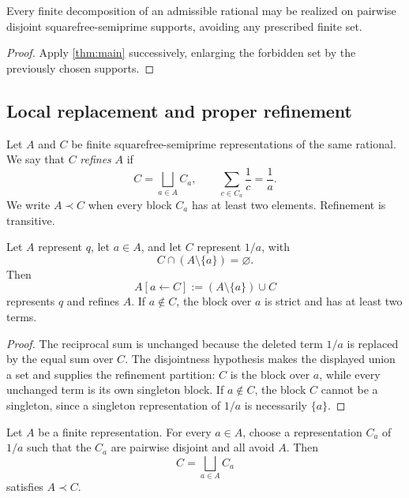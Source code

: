 \begin{corollary}
\label{cor:disjoint-realization}
Every finite decomposition of an admissible rational may be realized on pairwise disjoint squarefree-semiprime supports, avoiding any prescribed finite set.
\end{corollary}

\begin{proof}
Apply \cref{thm:main} successively, enlarging the forbidden set by the previously chosen supports.
\end{proof}

\subsection{Local replacement and proper refinement}

\begin{definition}
Let $A$ and $C$ be finite squarefree-semiprime representations of the same rational.  We say that $C$ \emph{refines} $A$ if
\[
 C=\bigsqcup_{a\in A}C_a,
 \qquad
 \sum_{c\in C_a}\frac1c=\frac1a.
\]
We write $A\prec C$ when every block $C_a$ has at least two elements.  Refinement is transitive.
\end{definition}

\begin{lemma}
\label{lem:local-replacement}
Let $A$ represent $q$, let $a\in A$, and let $C$ represent $1/a$, with
\[
 C\cap(A\setminus\{a\})=\varnothing.
\]
Then
\[
 A[a\leftarrow C]:=(A\setminus\{a\})\cup C
\]
represents $q$ and refines $A$.  If $a\notin C$, the block over $a$ is strict and has at least two terms.
\end{lemma}

\begin{proof}
The reciprocal sum is unchanged because the deleted term $1/a$ is replaced by the equal sum over $C$.  The disjointness hypothesis makes the displayed union a set and supplies the refinement partition: $C$ is the block over $a$, while every unchanged term is its own singleton block.  If $a\notin C$, the block $C$ cannot be a singleton, since a singleton representation of $1/a$ is necessarily $\{a\}$.
\end{proof}

\begin{corollary}
\label{cor:simultaneous-proper-replacement}
Let $A$ be a finite representation.  For every $a\in A$, choose a representation $C_a$ of $1/a$ such that the $C_a$ are pairwise disjoint and all avoid $A$.  Then
\[
 C=\bigsqcup_{a\in A}C_a
\]
satisfies $A\prec C$.
\end{corollary}


